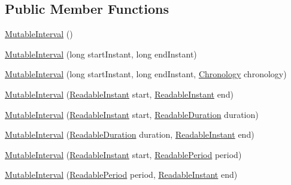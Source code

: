 \subsection*{Public Member Functions}
\begin{DoxyCompactItemize}
\item 
\hyperlink{classorg_1_1joda_1_1time_1_1_mutable_interval_a0b09bbabcb8452368e083c1c20bb98b1}{Mutable\-Interval} ()
\item 
\hyperlink{classorg_1_1joda_1_1time_1_1_mutable_interval_a4877453e5aa00191f90d7298b6640699}{Mutable\-Interval} (long start\-Instant, long end\-Instant)
\item 
\hyperlink{classorg_1_1joda_1_1time_1_1_mutable_interval_a90b70673169cdaa03c7346b6a5a67aab}{Mutable\-Interval} (long start\-Instant, long end\-Instant, \hyperlink{classorg_1_1joda_1_1time_1_1_chronology}{Chronology} chronology)
\item 
\hyperlink{classorg_1_1joda_1_1time_1_1_mutable_interval_a1dbfc34ceb7b3f994f77ee3cf6e6990d}{Mutable\-Interval} (\hyperlink{interfaceorg_1_1joda_1_1time_1_1_readable_instant}{Readable\-Instant} start, \hyperlink{interfaceorg_1_1joda_1_1time_1_1_readable_instant}{Readable\-Instant} end)
\item 
\hyperlink{classorg_1_1joda_1_1time_1_1_mutable_interval_af3ca0f4ae8124e70a1d24b1a066ef11d}{Mutable\-Interval} (\hyperlink{interfaceorg_1_1joda_1_1time_1_1_readable_instant}{Readable\-Instant} start, \hyperlink{interfaceorg_1_1joda_1_1time_1_1_readable_duration}{Readable\-Duration} duration)
\item 
\hyperlink{classorg_1_1joda_1_1time_1_1_mutable_interval_a12d101eda275bb38ed327269e7ebb3d7}{Mutable\-Interval} (\hyperlink{interfaceorg_1_1joda_1_1time_1_1_readable_duration}{Readable\-Duration} duration, \hyperlink{interfaceorg_1_1joda_1_1time_1_1_readable_instant}{Readable\-Instant} end)
\item 
\hyperlink{classorg_1_1joda_1_1time_1_1_mutable_interval_a063efe054c821b994cefeab08e99b1f4}{Mutable\-Interval} (\hyperlink{interfaceorg_1_1joda_1_1time_1_1_readable_instant}{Readable\-Instant} start, \hyperlink{interfaceorg_1_1joda_1_1time_1_1_readable_period}{Readable\-Period} period)
\item 
\hyperlink{classorg_1_1joda_1_1time_1_1_mutable_interval_a6aac372f3a6c8a2942f19829a40d0d51}{Mutable\-Interval} (\hyperlink{interfaceorg_1_1joda_1_1time_1_1_readable_period}{Readable\-Period} period, \hyperlink{interfaceorg_1_1joda_1_1time_1_1_readable_instant}{Readable\-Instant} end)
\item 

\end{DoxyCompactItemize}
